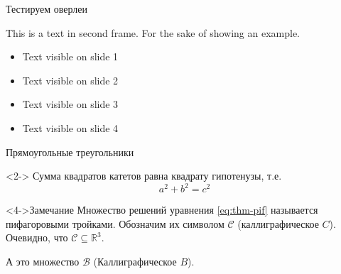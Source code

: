 \documentclass[aspectratio=169, 12pt]{beamer}
\begin{document}
\begin{frame}[label={sec:org8a37c9f}]{Тестируем оверлеи}

    This is a text in second frame.  For the sake of showing an example.

    \begin{itemize}[<+->]
        \item Text visible on slide 1
        \item Text visible on slide 2
        \item Text visible on slide 3
        \item Text visible on slide 4
    \end{itemize}
\end{frame}
\begin{frame}[label={sec:org20e9a2f}]{Прямоугольные треугольники}

    \begin{theorem}
        <2->
        Сумма квадратов катетов равна квадрату гипотенузы, т.е.
        \begin{equation}
            \label{eq:thm-pif}
            a^2 + b^2 = c^2
        \end{equation}
    \end{theorem}

    \begin{alertblock}<4->{Замечание}
        Множество решений уравнения \eqref{eq:thm-pif} называется пифагоровыми тройками.
        Обозначим их символом \(\mathcal{C}\) (каллиграфическое \(C\)).
        Очевидно, что \(\mathcal{C}\subseteq \mathbb{R}^{3}\).

        А это множество \(\mathcal{B}\) (Каллиграфическое \(B\)).
    \end{alertblock}
\end{frame}
\end{document}
